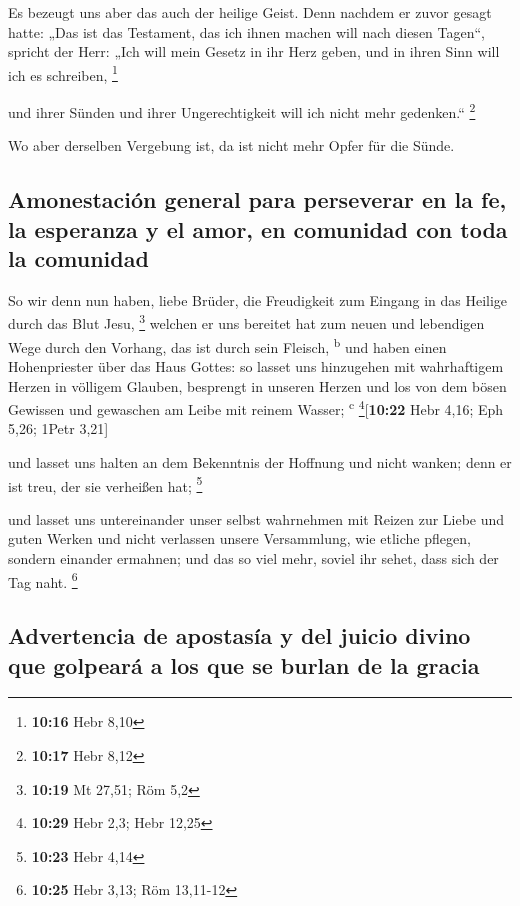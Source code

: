  Es bezeugt uns aber das auch der heilige Geist. Denn
nachdem er zuvor gesagt hatte:  „Das ist das Testament,
das ich ihnen machen will nach diesen Tagen``, spricht der Herr: „Ich
will mein Gesetz in ihr Herz geben, und in ihren Sinn will ich es
schreiben, \footnote{\textbf{10:16} Hebr 8,10}

 und ihrer Sünden und ihrer Ungerechtigkeit will ich
nicht mehr gedenken.`` \footnote{\textbf{10:17} Hebr 8,12}

 Wo aber derselben Vergebung ist, da ist nicht mehr Opfer
für die Sünde.

\hypertarget{amonestaciuxf3n-general-para-perseverar-en-la-fe-la-esperanza-y-el-amor-en-comunidad-con-toda-la-comunidad}{%
\subsection{Amonestación general para perseverar en la fe, la esperanza
y el amor, en comunidad con toda la
comunidad}\label{amonestaciuxf3n-general-para-perseverar-en-la-fe-la-esperanza-y-el-amor-en-comunidad-con-toda-la-comunidad}}

 So wir denn nun haben, liebe Brüder, die Freudigkeit zum
Eingang in das Heilige durch das Blut Jesu, \footnote{\textbf{10:19} Mt
  27,51; Röm 5,2}  welchen er uns bereitet hat zum neuen
und lebendigen Wege durch den Vorhang, das ist durch sein Fleisch,
\textsuperscript{b}  und haben einen Hohenpriester über
das Haus Gottes:  so lasset uns hinzugehen mit
wahrhaftigem Herzen in völligem Glauben, besprengt in unseren Herzen und
los von dem bösen Gewissen und gewaschen am Leibe mit reinem Wasser;
\textsuperscript{c} \footnote{\textbf{10:29} Hebr 2,3; Hebr 12,25}{[}\textbf{10:22}
Hebr 4,16; Eph 5,26; 1Petr 3,21{]}

 und lasset uns halten an dem Bekenntnis der Hoffnung und
nicht wanken; denn er ist treu, der sie verheißen hat; \footnote{\textbf{10:23}
  Hebr 4,14}

 und lasset uns untereinander unser selbst wahrnehmen mit
Reizen zur Liebe und guten Werken  und nicht verlassen
unsere Versammlung, wie etliche pflegen, sondern einander ermahnen; und
das so viel mehr, soviel ihr sehet, dass sich der Tag naht. \footnote{\textbf{10:25}
  Hebr 3,13; Röm 13,11-12}

\hypertarget{advertencia-de-apostasuxeda-y-del-juicio-divino-que-golpearuxe1-a-los-que-se-burlan-de-la-gracia}{%
\subsection{Advertencia de apostasía y del juicio divino que golpeará a
los que se burlan de la
gracia}\label{advertencia-de-apostasuxeda-y-del-juicio-divino-que-golpearuxe1-a-los-que-se-burlan-de-la-gracia}}

